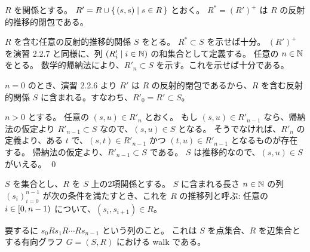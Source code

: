 \begin{jtheorem}[反射的推移的閉包の構成的定義]
  \label{反射的推移的閉包の構成的定義}
  $R$ を関係とする。
  $R' = R \cup \{\,(s, s) \mid s \in R\,\}$ とおく。
  $R^* = (R')^+$ は $R$ の反射的推移的閉包である。
\end{jtheorem}
\begin{jproof}
  $R$ を含む任意の反射的推移的関係 $S$ をとる。
  $R^* \subset S$ を示せば十分。
  $(R')^+$ を演習 2.2.7 と同様に、列 $(R'_i \mid i \in \mathbb{N})$ の和集合として定義する。
  任意の $n \in \mathbb{N}$ をとる。
  数学的帰納法により、$R'_n \subset S$ を示す。これを示せば十分である。

  $n = 0$ のとき、演習 2.2.6 より $R'$ は $R$ の反射的閉包であるから、$R$ を含む反射的関係 $S$ に含まれる。すなわち、$R'_0 = R' \subset S$。

  $n > 0$ とする。
  任意の $(s, u) \in R'_n$ とおく。
  もし $(s, u) \in R'_{n-1}$ なら、帰納法の仮定より $R'_{n-1} \subset S$ なので、$(s, u) \in S$ となる。
  そうでなければ、$R'_n$ の定義より、ある $t$ で、$(s, t) \in R'_{n-1}$ かつ $(t, u) \in R'_{n-1}$ となるものが存在する。
  帰納法の仮定より、$R'_{n-1} \subset S$ である。
  $S$ は推移的なので、$(s, u) \in S$ がいえる。
  \qed
\end{jproof}

\begin{jdefinition}[推移列]
  $S$ を集合とし、$R$ を $S$ 上の2項関係とする。
  $S$ に含まれる長さ $n \in \mathbb{N}$ の列 $(s_i)_{i=0}^{n-1}$ が次の条件を満たすとき、これを $R$ の推移列と呼ぶ:
  任意の $i \in [0, n-1)$ について、$(s_i, s_{i+1}) \in R$。
\end{jdefinition}
\begin{jremark*}
  要するに $s_0 R s_1 R \cdots R s_{n-1}$ という列のこと。
  これは $S$ を点集合、$R$ を辺集合とする有向グラフ $G = (S, R)$ における walk である。
\end{jremark*}

